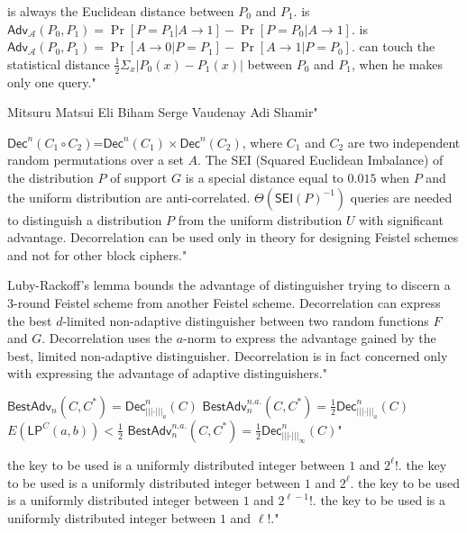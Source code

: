 {is always the Euclidean distance between $P_0$ and $P_1$.}
{is $\mathsf{Adv}_{\mathcal{A}} (P_0 , P_1 ) = \Pr[P = P_1|A \rightarrow 1]-\Pr[P = P_0| A \rightarrow 1]$.}
{is $\mathsf{Adv}_{\mathcal{A}} (P_0 , P_1 ) = \Pr[A \rightarrow 0|P = P_1 ]-\Pr[A \rightarrow 1|P = P_0]$.}
{can touch the statistical distance $\frac{1}{2}\Sigma_{x}|P_0(x) - P_1(x)|$ between $P_0$ and $P_1$, when he makes only one query."}

{Mitsuru Matsui}
{Eli Biham}
{Serge Vaudenay}
{Adi Shamir"}

{$\mathsf{Dec}^n(C_1\circ C_2)$=$\mathsf{Dec}^n(C_1) \times \mathsf{Dec}^n(C_2)$, where $C_1$ and $C_2$ are two independent random permutations over a set $A$.}
{The SEI (Squared Euclidean Imbalance) of the distribution $P$ of support $G$ is a special distance equal to $0.015$ when $P$ and the uniform distribution are anti-correlated.}
{$\Theta(\mathsf{SEI}(P)^{-1})$ queries are needed to distinguish a distribution $P$ from the uniform distribution $U$ with significant advantage.}
{Decorrelation can be used only in theory for designing Feistel schemes and not for other block ciphers."}

{Luby-Rackoff's lemma bounds the advantage of distinguisher trying to discern a 3-round Feistel scheme from another Feistel scheme.}
{Decorrelation can express the best $d$-limited non-adaptive distinguisher between two random functions $F$ and $G$.}
{Decorrelation uses the $a$-norm to express the advantage gained by the best, limited non-adaptive distinguisher.}
{Decorrelation is in fact concerned only with expressing the advantage of adaptive distinguishers."}

{$\mathsf{BestAdv}_n(C,C^\ast)=\mathsf{Dec}^n_{\left|\left|\left|\cdot\right|\right|\right|_a}(C)$}
{$\mathsf{BestAdv}_n^{n.a.}(C,C^\ast)=\frac{1}{2}\mathsf{Dec}^n_{\left|\left|\left|\cdot\right|\right|\right|_a}(C)$}
{$E(\mathsf{LP}^{C}(a,b)) < \frac{1}{2}$}
{$\mathsf{BestAdv}_n^{n.a.}(C,C^\ast)=\frac{1}{2}\mathsf{Dec}^n_{\left|\left|\left|\cdot\right|\right|\right|_\infty}(C)$"}

{the key to be used is a uniformly distributed integer between $1$ and $2^\ell !$.}
{the key to be used is a uniformly distributed integer between $1$ and $2^\ell$.}
{the key to be used is a uniformly distributed integer between $1$ and $2^{\ell-1} !$.}
{the key to be used is a uniformly distributed integer between $1$ and $\ell!$."}

